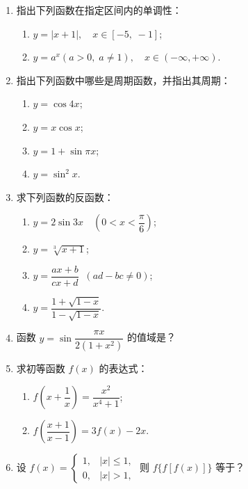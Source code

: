 \begin{enumerate}
    \item 指出下列函数在指定区间内的单调性：
    \begin{enumerate}[(1)]\setlength{\itemsep}{5pt}\setlength{\topsep}{15pt}
        \item $y=|x+1|,\quad x\in[-5,\;-1]$;
        \item $y=a^x(a>0,\;a\not=1),\quad x\in(-\infty,+\infty)$.
    \end{enumerate}

    \item 指出下列函数中哪些是周期函数，并指出其周期：
    \begin{enumerate}[(1)]\setlength{\itemsep}{5pt}\setlength{\topsep}{15pt}
        \item $y=\cos 4x$;
        \item $y=x\cos x$;
        \item $y=1+\sin \pi x$;
        \item $y=\sin^2x$.
    \end{enumerate}

    \item 求下列函数的反函数：
    \begin{enumerate}[(1)]\setlength{\itemsep}{5pt}\setlength{\topsep}{15pt}
        \item $y=2\sin 3x\quad\left(0<x<\dfrac{\pi}{6}\right)$;
        \item $y=\sqrt[3]{x+1}$;
        \item $y=\dfrac{ax+b}{cx+d}\;\;(ad-bc\not=0)$;
        \item $y=\dfrac{1+\sqrt{1-x}}{1-\sqrt{1-x}}$.
    \end{enumerate}

    \item 函数 $y=\sin\dfrac{\pi x}{2(1+x^2)}$ 的值域是？
    
    \item 求初等函数 $f(x)$ 的表达式：
    \begin{enumerate}[(1)]\setlength{\itemsep}{5pt}\setlength{\topsep}{15pt}
        \item $f\left(x+\dfrac{1}{x}\right)=\dfrac{x^2}{x^4+1}$;
        \item $f\left(\dfrac{x+1}{x-1}\right)=3f(x)-2x$.
    \end{enumerate}

    \item 设 $f(x)=\begin{cases}
        1,&|x|\leqslant 1,\\
        0,&|x|>1,
    \end{cases}$ 则 $f\{f[f(x)]\}$ 等于？


\end{enumerate}
